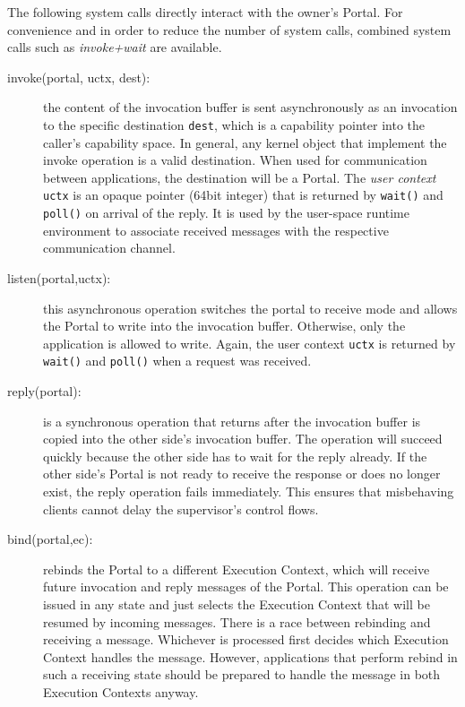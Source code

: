 The following system calls directly interact with the owner's Portal. For convenience and in order to reduce the number of system calls, combined system calls such as \emph{invoke+wait} are available.

\begin{description}
\item[invoke(portal, uctx, dest):] the content of the invocation buffer is sent asynchronously as an invocation to the specific destination \texttt{dest}, which is a capability pointer into the caller's capability space. In general, any kernel object that implement the invoke operation is a valid destination. When used for communication between applications, the destination will be a Portal. The \emph{user context} \texttt{uctx} is an opaque pointer (64bit integer) that is returned by \texttt{wait()} and \texttt{poll()} on arrival of the reply. It is used by the user-space runtime environment to associate received messages with the respective communication channel.
 
\item[listen(portal,uctx):] this asynchronous operation switches the portal to receive mode and allows the Portal to write into the invocation buffer. Otherwise, only the application is allowed to write. Again, the user context \texttt{uctx} is returned by \texttt{wait()} and \texttt{poll()} when a request was received.

\item[reply(portal):] is a synchronous operation that returns after the invocation buffer is copied into the other side's invocation buffer. The operation will succeed quickly because the other side has to wait for the reply already. If the other side's Portal is not ready to receive the response or does no longer exist, the reply operation fails immediately. This ensures that misbehaving clients cannot delay the supervisor's control flows.

\item[bind(portal,ec):] rebinds the Portal to a different Execution Context, which will receive future invocation and reply messages of the Portal. This operation can be issued in any state and just selects the Execution Context that will be resumed by incoming messages. There is a race between rebinding and receiving a message. Whichever is processed first decides which Execution Context handles the message. However, applications that perform rebind in such a receiving state should be prepared to handle the message in both Execution Contexts anyway.   


\end{description}
